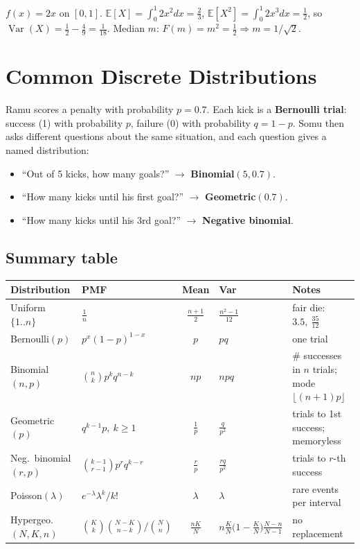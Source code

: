 \documentclass[11pt,a4paper]{article}
\newcommand{\E}{\mathbb{E}}
\newcommand{\Var}{\operatorname{Var}}
\begin{document}
\begin{example}
$f(x)=2x$ on $[0,1]$. $\E[X]=\int_0^1 2x^2dx=\tfrac23$, $\E[X^2]=\int_0^1 2x^3dx=\tfrac12$, so $\Var(X)=\tfrac12-\tfrac49=\tfrac1{18}$. Median $m$: $F(m)=m^2=\tfrac12\Rightarrow m=1/\sqrt2$.
\end{example}

\newpage
\section{Common Discrete Distributions}

\begin{story}
Ramu scores a penalty with probability $p=0.7$. Each kick is a \textbf{Bernoulli trial}: success (1) with probability $p$, failure (0) with probability $q=1-p$. Somu then asks different questions about the same situation, and each question gives a named distribution:
\begin{itemize}[noitemsep]
\item ``Out of 5 kicks, how many goals?'' $\to$ \textbf{Binomial}$(5,0.7)$.
\item ``How many kicks until his first goal?'' $\to$ \textbf{Geometric}$(0.7)$.
\item ``How many kicks until his 3rd goal?'' $\to$ \textbf{Negative binomial}.
\end{itemize}
\end{story}

\subsection{Summary table}
\begin{center}
\small
\begin{tabularx}{\textwidth}{>{\raggedright\arraybackslash}p{2.7cm} >{\raggedright\arraybackslash}p{4.0cm} c >{\raggedright\arraybackslash}p{2.6cm} >{\raggedright\arraybackslash}X}
\toprule
\textbf{Distribution} & \textbf{PMF} & \textbf{Mean} & \textbf{Var} & \textbf{Notes}\\
\midrule
Uniform $\{1..n\}$ & $\frac1n$ & $\frac{n+1}{2}$ & $\frac{n^2-1}{12}$ & fair die: $3.5,\ \frac{35}{12}$\\
Bernoulli$(p)$ & $p^x(1-p)^{1-x}$ & $p$ & $pq$ & one trial\\
Binomial$(n,p)$ & $\binom nk p^kq^{n-k}$ & $np$ & $npq$ & \# successes in $n$ trials; mode $\lfloor(n+1)p\rfloor$\\
Geometric$(p)$ & $q^{k-1}p,\ k\ge1$ & $\frac1p$ & $\frac{q}{p^2}$ & trials to 1st success; memoryless\\
Neg.\ binomial$(r,p)$ & $\binom{k-1}{r-1}p^rq^{k-r}$ & $\frac rp$ & $\frac{rq}{p^2}$ & trials to $r$-th success\\
Poisson$(\lambda)$ & $e^{-\lambda}\lambda^k/k!$ & $\lambda$ & $\lambda$ & rare events per interval\\
Hypergeo.$(N,K,n)$ & $\binom Kk\binom{N-K}{n-k}\big/\binom Nn$ & $\frac{nK}{N}$ & $n\frac KN\big(1-\frac KN\big)\frac{N-n}{N-1}$ & no replacement\\
\bottomrule
\end{tabularx}
\end{center}
\end{document}
